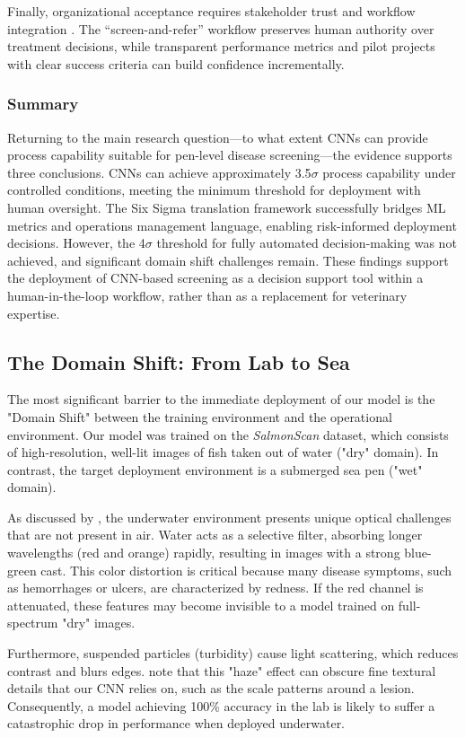 \documentclass[12pt,a4paper]{article}
\begin{document}
Finally, organizational acceptance requires stakeholder trust and workflow integration \citep{10.1108/TQM-11-2023-0361}. The ``screen-and-refer'' workflow preserves human authority over treatment decisions, while transparent performance metrics and pilot projects with clear success criteria can build confidence incrementally.

\subsubsection{Summary}
Returning to the main research question---to what extent CNNs can provide process capability suitable for pen-level disease screening---the evidence supports three conclusions. CNNs can achieve approximately 3.5$\sigma$ process capability under controlled conditions, meeting the minimum threshold for deployment with human oversight. The Six Sigma translation framework successfully bridges ML metrics and operations management language, enabling risk-informed deployment decisions. However, the 4$\sigma$ threshold for fully automated decision-making was not achieved, and significant domain shift challenges remain. These findings support the deployment of CNN-based screening as a decision support tool within a human-in-the-loop workflow, rather than as a replacement for veterinary expertise.

\subsection{The Domain Shift: From Lab to Sea}
The most significant barrier to the immediate deployment of our model is the "Domain Shift" between the training environment and the operational environment. Our model was trained on the \emph{SalmonScan} dataset, which consists of high-resolution, well-lit images of fish taken out of water ("dry" domain). In contrast, the target deployment environment is a submerged sea pen ("wet" domain).

As discussed by \cite{10048777}, the underwater environment presents unique optical challenges that are not present in air. Water acts as a selective filter, absorbing longer wavelengths (red and orange) rapidly, resulting in images with a strong blue-green cast. This color distortion is critical because many disease symptoms, such as hemorrhages or ulcers, are characterized by redness. If the red channel is attenuated, these features may become invisible to a model trained on full-spectrum "dry" images.

Furthermore, suspended particles (turbidity) cause light scattering, which reduces contrast and blurs edges. \cite{JIAN2021116088} note that this "haze" effect can obscure fine textural details that our CNN relies on, such as the scale patterns around a lesion. Consequently, a model achieving 100\% accuracy in the lab is likely to suffer a catastrophic drop in performance when deployed underwater.
\end{document}
